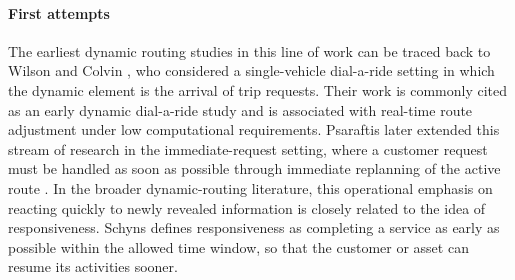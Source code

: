 \paragraph{First attempts}
The earliest dynamic routing studies in this line of work can be traced back to Wilson and Colvin
\cite{wilson1977computer}, who considered a single-vehicle dial-a-ride setting in which the dynamic
element is the arrival of trip requests. Their work is commonly cited as an early dynamic dial-a-ride
study and is associated with real-time route adjustment under low computational requirements.
Psaraftis later extended this stream of research in the immediate-request setting, where a customer
request must be handled as soon as possible through immediate replanning of the active route
\cite{psaraftisDynamicProgrammingSolution1980}. In the broader dynamic-routing literature, this
operational emphasis on reacting quickly to newly revealed information is closely related to the idea
of responsiveness. Schyns \cite{AntColonySchyns2015} defines responsiveness as completing a service
as early as possible within the allowed time window, so that the customer or asset can resume its
activities sooner.
